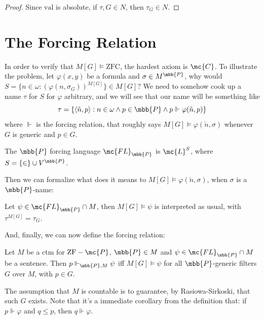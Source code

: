 \begin{proof}
    Since $\text{val}$ is absolute, if $\tau,G\in N$, then $\tau_G\in N$.
\end{proof}

\section{The Forcing Relation}

In order to verify that $M[G]\vDash\text{ZFC}$, the hardest axiom is $\mc{C}$. To illustrate the problem, let $\varphi(x,y)$ be a formula and $\sigma\in M^{\mbb{P}}$, why would $S=\{n\in\omega:(\varphi(n,\sigma_G))^{M[G]}\}\in M[G]$? We need to somehow cook up a name $\tau$ for $S$ for $\varphi$ arbitrary, and we will see that our name will be something like
\begin{equation}
    \tau=\{\langle\check{n},p\rangle:n\in\omega\wedge p\in\mbb{P}\wedge p\Vdash\varphi(\check{n},p)\}
\end{equation}
where $\Vdash$ is the forcing relation, that roughly says $M[G]\vDash\varphi(\check{n},\sigma)$ whenever $G$ is generic and $p\in G$.

\begin{definition}{}{}
    The $\mbb{P}$ forcing language $\mc{FL}_{\mbb{P}}$ is $\mc{L}^S$, where $S=\{\in\}\cup V^{\mbb{P}}$.
\end{definition}

Then we can formalize what does it means to $M[G]\vDash\varphi(\check{n},\sigma)$, when $\sigma$ is a $\mbb{P}$-name:

\begin{definition}{}{}
    Let $\psi\in\mc{FL}_{\mbb{P}}\cap M$, then $M[G]\vDash\psi$ is interpreted as usual, with $\tau^{M[G]}=\tau_G$.
\end{definition}

And, finally, we can now define the forcing relation:

\begin{definition}{}{}
    Let $M$ be a ctm for $\text{ZF}-\mc{P}$, $\mbb{P}\in M$ and $\psi\in\mc{FL}_{\mbb{P}}\cap M$ be a sentence. Then $p\Vdash_{\mbb{P},M}\psi$ iff $M[G]\vDash\psi$ for all $\mbb{P}$-generic filters $G$ over $M$, with $p\in G$.
\end{definition}

The assumption that $M$ is countable is to guarantee, by Rasiowa-Sirkoski, that such $G$ exists. Note that it's a immediate corollary from the definition that: if $p\Vdash\varphi$ and $q\leq p$, then $q\Vdash\varphi$.


